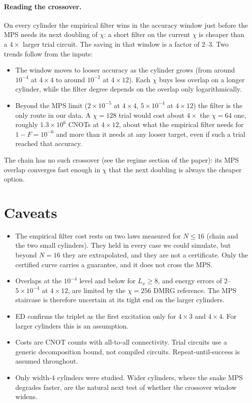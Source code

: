 \documentclass[10pt]{article}
\begin{document}
\paragraph{Reading the crossover.} On every cylinder the empirical filter wins in the accuracy window just
before the MPS needs its next doubling of $\chi$: a short filter on the current $\chi$ is cheaper than a
$4\times$ larger trial circuit. The saving in that window is a factor of 2--3. Two trends follow from the inputs:
\begin{itemize}
\item The window moves to looser accuracy as the cylinder grows (from around $10^{-4}$ at $4\times4$ to around
$10^{-2}$ at $4\times12$). Each $\chi$ buys less overlap on a longer cylinder, while the filter degree depends on
the overlap only logarithmically.
\item Beyond the MPS limit ($2\times10^{-5}$ at $4\times4$, $5\times10^{-4}$ at $4\times12$) the filter is the only
route in our data. A $\chi=128$ trial would cost about $4\times$ the $\chi=64$ one, roughly $1.3\times10^{6}$ CNOTs at
$4\times12$, about what the empirical filter needs for $1-F=10^{-6}$ and more than it needs at any looser target, even if such a trial reached that accuracy.
\end{itemize}
The chain has no such crossover (see the regime section of the paper): its MPS overlap converges fast enough in $\chi$ that the next
doubling is always the cheaper option.

\section{Caveats}
\begin{itemize}
\item The empirical filter cost rests on two laws measured for $N\le16$ (chain and the two small cylinders).
They held in every case we could simulate, but beyond $N=16$ they are extrapolated, and they are not a
certificate. Only the certified curve carries a guarantee, and it does not cross the MPS.
\item Overlaps at the $10^{-4}$ level and below for $L_x\ge8$, and energy errors of $2$--$5\times10^{-4}$ at $4\times12$,
are limited by the $\chi=256$ DMRG reference. The MPS staircase is therefore uncertain at its tight end on
the larger cylinders.
\item ED confirms the triplet as the first excitation only for $4\times3$ and $4\times4$. For larger cylinders
this is an assumption.
\item Costs are CNOT counts with all-to-all connectivity. Trial circuits use a generic decomposition bound,
not compiled circuits. Repeat-until-success is assumed throughout.
\item Only width-4 cylinders were studied. Wider cylinders, where the snake MPS degrades faster, are the
natural next test of whether the crossover window widens.
\end{itemize}
\end{document}
